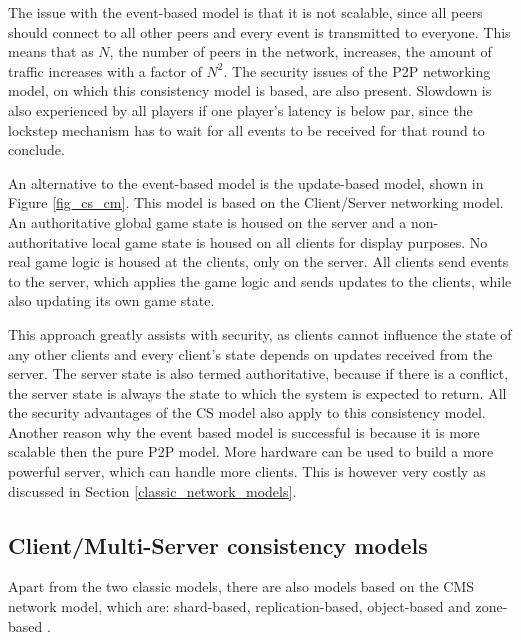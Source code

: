 \documentclass[journal,oneside,a4paper,onecolumn]{IEEEtran}
\begin{document}
The issue with the event-based model is that it is not scalable, since all peers should connect to all other peers and every event is transmitted to everyone. This means that as $N$, the number of peers in the network, increases, the amount of traffic increases with a factor of $N^2$. The security issues of the P2P networking model, on which this consistency model is based, are also present. Slowdown is also experienced by all players if one player's latency is below par, since the lockstep mechanism has to wait for all events to be received for that round to conclude.

An alternative to the event-based model is the update-based model, shown in Figure \ref{fig_cs_cm}. This model is based on the Client/Server networking model. An authoritative global game state is housed on the server and a non-authoritative local game state is housed on all clients for display purposes. No real game logic is housed at the clients, only on the server. All clients send events to the server, which applies the game logic and sends updates to the clients, while also updating its own game state.

This approach greatly assists with security, as clients cannot influence the state of any other clients and every client's state depends on updates received from the server. The server state is also termed authoritative, because if there is a conflict, the server state is always the state to which the system is expected to return. All the security advantages of the \ac{CS} model also apply to this consistency model. Another reason why the event based model is successful is because it is more scalable then the pure P2P model. More hardware can be used to build a more powerful server, which can handle more clients. This is however very costly as discussed in Section \ref{classic_network_models}.

\subsection{Client/Multi-Server consistency models}
\label{cms_models}


Apart from the two classic models, there are also models based on the \ac{CMS} network model, which are: shard-based, replication-based, object-based and zone-based \cite{Hu_voronoi_IM}.
\end{document}
